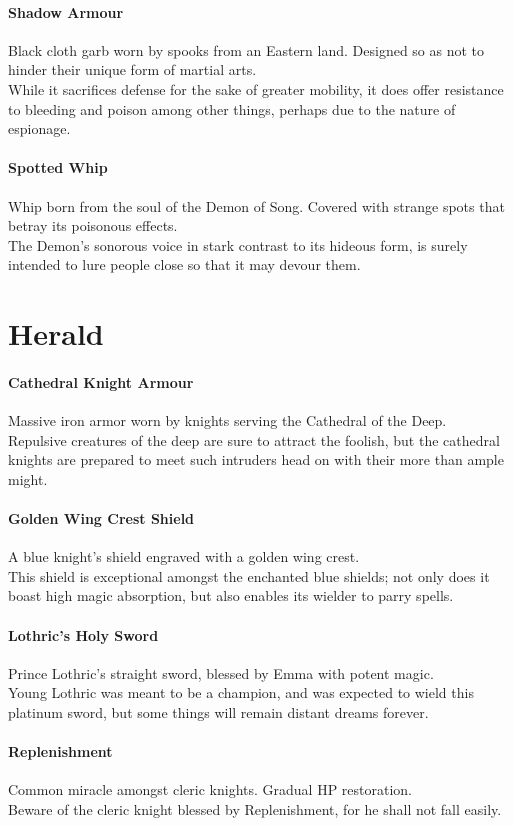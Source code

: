 \documentclass[twocolumn,a4paper]{article}
\begin{document}
\paragraph{Shadow Armour}
Black cloth garb worn by spooks from an Eastern land. Designed so as not to hinder their unique form of martial arts.\\
While it sacrifices defense for the sake of greater mobility, it does offer resistance to bleeding and poison among other things, perhaps due to the nature of espionage.
\paragraph{Spotted Whip}
Whip born from the soul of the Demon of Song. Covered with strange spots that betray its poisonous effects.\\
The Demon's sonorous voice in stark contrast to its hideous form, is surely intended to lure people close so that it may devour them.
\pagebreak %
\section*{Herald}
\paragraph{Cathedral Knight Armour}
Massive iron armor worn by knights serving the Cathedral of the Deep.\\
Repulsive creatures of the deep are sure to attract the foolish, but the cathedral knights are prepared to meet such intruders head on with their more than ample might.
\paragraph{Golden Wing Crest Shield}
A blue knight's shield engraved with a golden wing crest.\\
This shield is exceptional amongst the enchanted blue shields; not only does it boast high magic absorption, but also enables its wielder to parry spells.
\paragraph{Lothric's Holy Sword}
Prince Lothric's straight sword, blessed by Emma with potent magic.\\
Young Lothric was meant to be a champion, and was expected to wield this platinum sword, but some things will remain distant dreams forever.
\paragraph{Replenishment}
Common miracle amongst cleric knights. Gradual HP restoration.\\
Beware of the cleric knight blessed by Replenishment, for he shall not fall easily.
\end{document}
